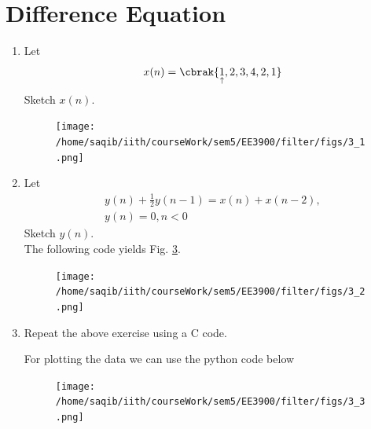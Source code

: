 \documentclass[journal,12pt,twocolumn]{IEEEtran}
\renewcommand\thesection{\arabic{section}}
\begin{document}
\section{Difference Equation}
\begin{enumerate}[label=\thesection.\arabic*,ref=\thesection.\theenumi]
\item Let
	\label{def:xn}
\begin{equation}
x(n) = \cbrak{\underset{\uparrow}{1},2,3,4,2,1}
\end{equation}
Sketch $x(n)$.\\
\solution

\begin{figure}[!ht]
\begin{center}
\texttt{[image: /home/saqib/iith/courseWork/sem5/EE3900/filter/figs/3\_1.png]}
\end{center}
\label{fig:xnyn}	
\end{figure}
\item Let
\begin{multline}
\label{eq:iir_filter}
y(n) + \frac{1}{2}y(n-1) = x(n) + x(n-2), 
\\
 y(n) = 0, n < 0
\end{multline}
Sketch $y(n)$.  
\\
\solution The following code yields Fig. \ref{fig:xnyn}.

\begin{figure}[!ht]
\begin{center}
\texttt{[image: /home/saqib/iith/courseWork/sem5/EE3900/filter/figs/3\_2.png]}
\end{center}
\label{fig:xnyn}	
\end{figure}
\item Repeat the above exercise using a C code.
\solution 

For plotting the data we can use the python code below

\begin{figure}[!ht]
\begin{center}
\texttt{[image: /home/saqib/iith/courseWork/sem5/EE3900/filter/figs/3\_3.png]}
\end{center}
\label{fig:xnyn}	
\end{figure}
\end{enumerate}
\end{document}
